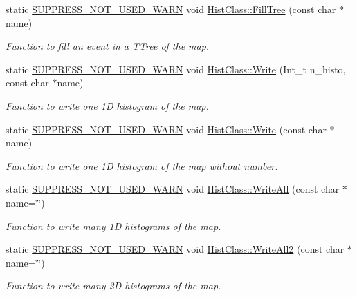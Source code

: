 \begin{DoxyCompactItemize}
static \hyperlink{HistClass_8hh_a85edd6ac47f5ea2970c76af20855738c}{S\-U\-P\-P\-R\-E\-S\-S\-\_\-\-N\-O\-T\-\_\-\-U\-S\-E\-D\-\_\-\-W\-A\-R\-N} void \hyperlink{namespaceHistClass_ab5bdb8590d6f7406c36ec2d02006ef4b}{Hist\-Class\-::\-Fill\-Tree} (const char $\ast$name)
\begin{DoxyCompactList}\small\item\em Function to fill an event in a T\-Tree of the map. \end{DoxyCompactList}\item 
static \hyperlink{HistClass_8hh_a85edd6ac47f5ea2970c76af20855738c}{S\-U\-P\-P\-R\-E\-S\-S\-\_\-\-N\-O\-T\-\_\-\-U\-S\-E\-D\-\_\-\-W\-A\-R\-N} void \hyperlink{namespaceHistClass_a4e32418150e24c0831808ff81fe72f17}{Hist\-Class\-::\-Write} (Int\-\_\-t n\-\_\-histo, const char $\ast$name)
\begin{DoxyCompactList}\small\item\em Function to write one 1\-D histogram of the map. \end{DoxyCompactList}\item 
static \hyperlink{HistClass_8hh_a85edd6ac47f5ea2970c76af20855738c}{S\-U\-P\-P\-R\-E\-S\-S\-\_\-\-N\-O\-T\-\_\-\-U\-S\-E\-D\-\_\-\-W\-A\-R\-N} void \hyperlink{namespaceHistClass_a1c14a1588d2bd2524d659c5db93007eb}{Hist\-Class\-::\-Write} (const char $\ast$name)
\begin{DoxyCompactList}\small\item\em Function to write one 1\-D histogram of the map without number. \end{DoxyCompactList}\item 
static \hyperlink{HistClass_8hh_a85edd6ac47f5ea2970c76af20855738c}{S\-U\-P\-P\-R\-E\-S\-S\-\_\-\-N\-O\-T\-\_\-\-U\-S\-E\-D\-\_\-\-W\-A\-R\-N} void \hyperlink{namespaceHistClass_a86d1965748fbd982ddcbca5bb62863e9}{Hist\-Class\-::\-Write\-All} (const char $\ast$name=\char`\"{}\char`\"{})
\begin{DoxyCompactList}\small\item\em Function to write many 1\-D histograms of the map. \end{DoxyCompactList}\item 
static \hyperlink{HistClass_8hh_a85edd6ac47f5ea2970c76af20855738c}{S\-U\-P\-P\-R\-E\-S\-S\-\_\-\-N\-O\-T\-\_\-\-U\-S\-E\-D\-\_\-\-W\-A\-R\-N} void \hyperlink{namespaceHistClass_ac9972fbc605ed3de9c687c518e740178}{Hist\-Class\-::\-Write\-All2} (const char $\ast$name=\char`\"{}\char`\"{})
\begin{DoxyCompactList}\small\item\em Function to write many 2\-D histograms of the map. \end{DoxyCompactList}\item 

\end{DoxyCompactItemize}
